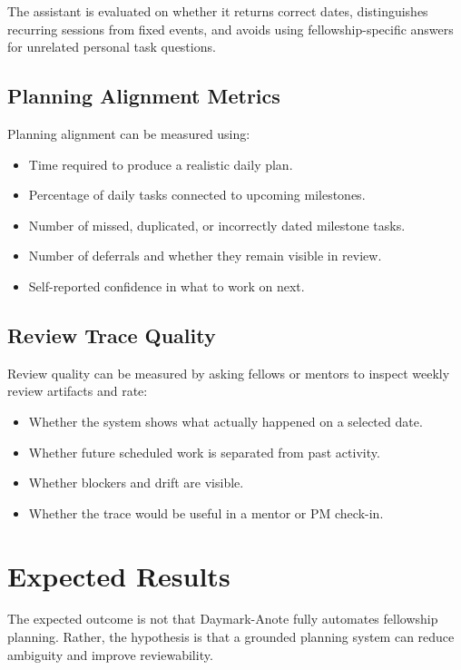 \documentclass[11pt]{article}
\begin{document}
The assistant is evaluated on whether it returns correct dates, distinguishes recurring sessions from fixed events, and avoids using fellowship-specific answers for unrelated personal task questions.

\subsection{Planning Alignment Metrics}

Planning alignment can be measured using:

\begin{itemize}[leftmargin=*]
  \item Time required to produce a realistic daily plan.
  \item Percentage of daily tasks connected to upcoming milestones.
  \item Number of missed, duplicated, or incorrectly dated milestone tasks.
  \item Number of deferrals and whether they remain visible in review.
  \item Self-reported confidence in what to work on next.
\end{itemize}

\subsection{Review Trace Quality}

Review quality can be measured by asking fellows or mentors to inspect weekly review artifacts and rate:

\begin{itemize}[leftmargin=*]
  \item Whether the system shows what actually happened on a selected date.
  \item Whether future scheduled work is separated from past activity.
  \item Whether blockers and drift are visible.
  \item Whether the trace would be useful in a mentor or PM check-in.
\end{itemize}

\section{Expected Results}

The expected outcome is not that Daymark-Anote fully automates fellowship planning. Rather, the hypothesis is that a grounded planning system can reduce ambiguity and improve reviewability.
\end{document}
